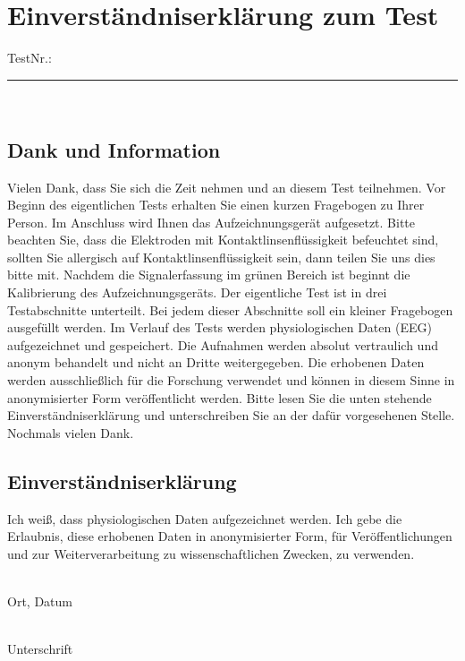 \documentclass[12pt,fleqn]{scrreprt}
\begin{document}
\section*{Einverständniserklärung zum Test}
\line
TestNr.: \rule{1cm}{.1pt} \\
\vspace{1cm}

\subsection*{Dank und Information}
Vielen Dank, dass Sie sich die Zeit nehmen und an diesem Test teilnehmen. 
Vor Beginn des eigentlichen Tests erhalten Sie einen kurzen Fragebogen zu Ihrer Person. 
Im Anschluss wird Ihnen das Aufzeichnungsgerät aufgesetzt. 
Bitte beachten Sie, dass die Elektroden mit Kontaktlinsenflüssigkeit befeuchtet sind, 
sollten Sie allergisch auf Kontaktlinsenflüssigkeit sein, dann teilen Sie uns dies bitte mit.
Nachdem die Signalerfassung im grünen Bereich ist beginnt die Kalibrierung des Aufzeichnungsgeräts.
Der eigentliche Test ist in drei Testabschnitte unterteilt.
Bei  jedem dieser Abschnitte soll ein kleiner Fragebogen ausgefüllt werden.
Im Verlauf des Tests werden physiologischen Daten (EEG) aufgezeichnet und gespeichert. 
Die Aufnahmen werden absolut vertraulich und anonym behandelt und nicht an Dritte weitergegeben. 
Die erhobenen Daten werden ausschließlich für die Forschung verwendet und können in diesem Sinne in anonymisierter Form veröffentlicht werden. 
Bitte lesen Sie die unten stehende Einverständniserklärung und unterschreiben Sie an der dafür vorgesehenen Stelle.
Nochmals vielen Dank.\\


\vspace{2cm}
\subsection*{Einverständniserklärung}
Ich weiß, dass physiologischen Daten aufgezeichnet werden. Ich gebe die Erlaubnis, diese erhobenen Daten in anonymisierter Form, für Veröffentlichungen und zur Weiterverarbeitung zu wissenschaftlichen Zwecken, zu verwenden.



\vspace{2.5cm}

\begin{minipage}[b]{0.45\textwidth}	
\line\\
 Ort, Datum
\end{minipage}
\hspace{2cm}
\quad
\begin{minipage}[b]{0.45\textwidth}
\line \\
 Unterschrift
\end{minipage}
\end{document}
